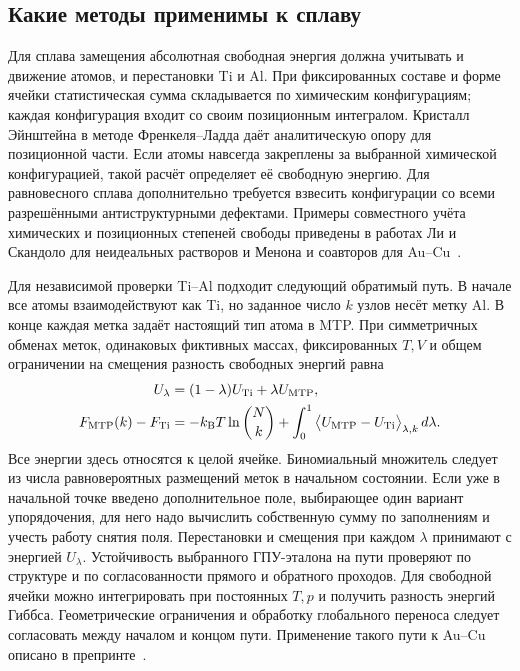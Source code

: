 \documentclass[11pt,a4paper]{article}
\begin{document}
\subsection{Какие методы применимы к сплаву}

Для сплава замещения абсолютная свободная энергия должна учитывать и движение
атомов, и перестановки Ti и Al. При фиксированных составе и форме ячейки
статистическая сумма складывается по химическим конфигурациям; каждая
конфигурация входит со своим позиционным интегралом. Кристалл Эйнштейна в
методе Френкеля--Ладда даёт аналитическую опору для позиционной части.
Если атомы навсегда закреплены за выбранной химической конфигурацией, такой
расчёт определяет её свободную энергию. Для равновесного сплава дополнительно
требуется взвесить конфигурации со всеми разрешёнными антиструктурными
дефектами. Примеры совместного учёта химических и позиционных степеней
свободы приведены в работах Ли и Скандоло для неидеальных растворов и
Менона и соавторов для Au--Cu~\cite{frenkel1984,li2024,menon2026}.

Для независимой проверки Ti--Al подходит следующий обратимый путь.
В начале все атомы взаимодействуют как Ti, но заданное число \(k\) узлов
несёт метку Al. В конце каждая метка задаёт настоящий тип атома в MTP.
При симметричных обменах меток, одинаковых фиктивных массах, фиксированных
\(T,V\) и общем ограничении на смещения разность свободных энергий равна
\begin{align}
 U_\lambda &=(1-\lambda)U_{\rm Ti}+\lambda U_{\rm MTP}, \notag\\
 F_{\rm MTP}(k)-F_{\rm Ti}
   &=-k_{\rm B}T\ln {N\choose k}
      +\int_0^1 \big\langle U_{\rm MTP}-U_{\rm Ti}
                        \big\rangle_{\lambda,k}\,d\lambda .
 \label{eq:alloy-alchemical}
\end{align}
Все энергии здесь относятся к целой ячейке. Биномиальный множитель следует
из числа равновероятных размещений меток в начальном состоянии. Если уже в
начальной точке введено дополнительное поле, выбирающее один вариант
упорядочения, для него надо вычислить собственную сумму по заполнениям и
учесть работу снятия поля. Перестановки и смещения при каждом \(\lambda\)
принимают с энергией \(U_\lambda\). Устойчивость выбранного
ГПУ-эталона на пути проверяют по структуре и по согласованности прямого
и обратного проходов. Для свободной ячейки можно
интегрировать при постоянных \(T,p\) и получить разность энергий Гиббса.
Геометрические ограничения и обработку глобального переноса следует
согласовать между началом и концом пути. Применение такого пути к Au--Cu
описано в препринте~\cite{menon2026}.
\end{document}
